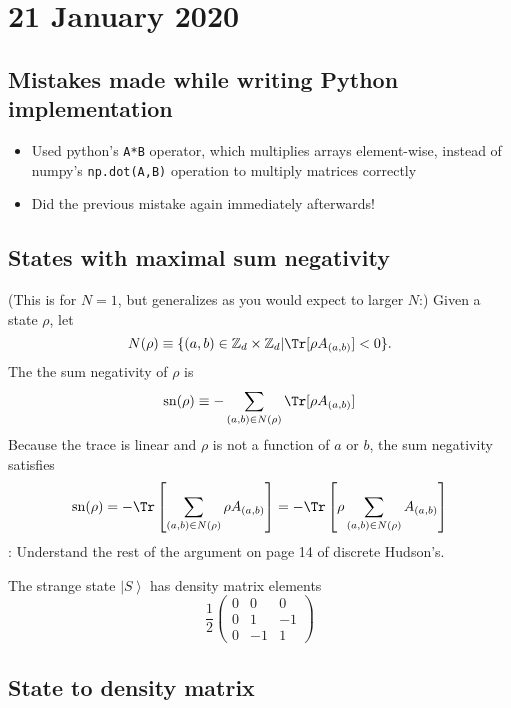 \documentclass{report}
\begin{document}
 \chapter{21 January 2020}
 
 \section{Mistakes made while writing Python implementation}
 
 \begin{itemize}
 \item Used python's \lstinline{A*B} operator, which multiplies arrays element-wise, instead of numpy's \lstinline{np.dot(A,B)} operation to multiply matrices correctly
 \item Did the previous mistake again immediately afterwards!
 \end{itemize}
 
 \section{States with maximal sum negativity}
 
(This is for $N=1$, but generalizes as you would expect to larger $N$:) Given a state $\rho$, let 
\begin{equation}N(\rho)\equiv\{(a,b)\in\mathbb Z_d\times \mathbb Z_d|\Tr[\rho A_{(a,b)}]<0\}.\end{equation}
 The the sum negativity of $\rho$ is
 \begin{equation}\operatorname{sn}(\rho)\equiv -\sum_{(a,b)\in N(\rho)}\Tr[\rho A_{(a,b)}]\end{equation}
 Because the trace is linear and $\rho$ is not a function of $a$ or $b$, the sum negativity satisfies
 \begin{equation}\operatorname{sn}(\rho)=-\Tr\left[\sum_{(a,b)\in N(\rho)}\rho A_{(a,b)}\right]=-\Tr\left[\rho\sum_{(a,b)\in N(\rho)}A_{(a,b)}\right]\end{equation}
 \todo: Understand the rest of the argument on page 14 of discrete Hudson's.
 
 The strange state $\left|S\right>$ has density matrix elements
 \begin{equation}\frac{1}{2}\begin{pmatrix}0&0&0\\0&1&-1\\0&-1&1\end{pmatrix}\end{equation}
 \section{State to density matrix}
 
\end{document}
